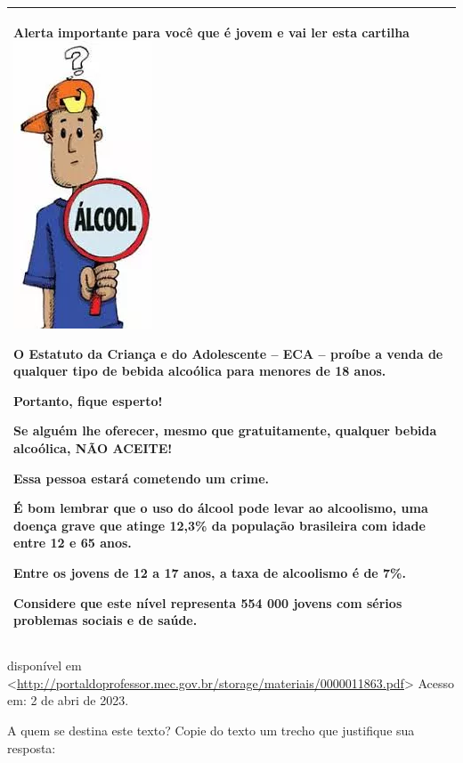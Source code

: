{\begin{longtable}[]{@{}
  >{\raggedright\arraybackslash}p{}@{}}
\toprule
\endhead
\textbf{Alerta importante para você que é jovem e vai ler esta
cartilha}\includegraphics[width=1.625in,height=3.36458in]{./imgSAEB_7_POR/media/image2.png}

O Estatuto da Criança e do Adolescente -- ECA -- proíbe a venda de
qualquer tipo de bebida alcoólica para menores de 18 anos.

Portanto, fique esperto!

Se alguém lhe oferecer, mesmo que gratuitamente, qualquer bebida
alcoólica, NÃO ACEITE!

Essa pessoa estará cometendo um crime.

É bom lembrar que o uso do álcool pode levar ao alcoolismo, uma doença
grave que atinge 12,3\% da população brasileira com idade entre 12 e 65
anos.

Entre os jovens de 12 a 17 anos, a taxa de alcoolismo é de 7\%.

Considere que este nível representa 554 000 jovens com sérios problemas
sociais e de saúde. \\
\bottomrule
\end{longtable}

disponível em
\textless{}\href{http://portaldoprofessor.mec.gov.br/storage/materiais/0000011863.pdf}{\uline{http://portaldoprofessor.mec.gov.br/storage/materiais/0000011863.pdf}}\textgreater{}
Acesso em: 2 de abri de 2023.

\begin{escolha}
  \item A quem se destina este texto? Copie do texto um trecho que justifique
  sua resposta:


\end{escolha}}
